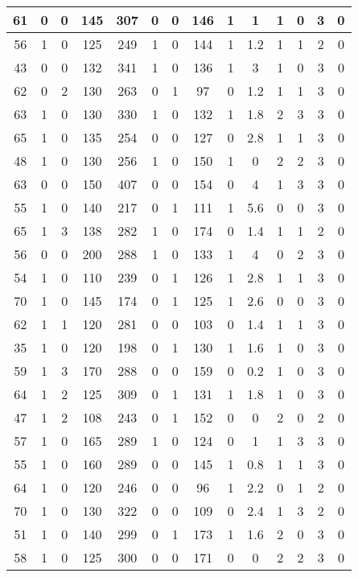 \documentclass{article}
\begin{document}
\begin{longtable}{|c|c|c|c|c|c|c|c|c|c|c|c|c|c|}
\hline
61 & 0 & 0 & 145 & 307 & 0 & 0 & 146 & 1 & 1 & 1 & 0 & 3 & 0\\
\hline
56 & 1 & 0 & 125 & 249 & 1 & 0 & 144 & 1 & 1.2 & 1 & 1 & 2 & 0\\
\hline
43 & 0 & 0 & 132 & 341 & 1 & 0 & 136 & 1 & 3 & 1 & 0 & 3 & 0\\
\hline
62 & 0 & 2 & 130 & 263 & 0 & 1 & 97 & 0 & 1.2 & 1 & 1 & 3 & 0\\
\hline
63 & 1 & 0 & 130 & 330 & 1 & 0 & 132 & 1 & 1.8 & 2 & 3 & 3 & 0\\
\hline
65 & 1 & 0 & 135 & 254 & 0 & 0 & 127 & 0 & 2.8 & 1 & 1 & 3 & 0\\
\hline
48 & 1 & 0 & 130 & 256 & 1 & 0 & 150 & 1 & 0 & 2 & 2 & 3 & 0\\
\hline
63 & 0 & 0 & 150 & 407 & 0 & 0 & 154 & 0 & 4 & 1 & 3 & 3 & 0\\
\hline
55 & 1 & 0 & 140 & 217 & 0 & 1 & 111 & 1 & 5.6 & 0 & 0 & 3 & 0\\
\hline
65 & 1 & 3 & 138 & 282 & 1 & 0 & 174 & 0 & 1.4 & 1 & 1 & 2 & 0\\
\hline
56 & 0 & 0 & 200 & 288 & 1 & 0 & 133 & 1 & 4 & 0 & 2 & 3 & 0\\
\hline
54 & 1 & 0 & 110 & 239 & 0 & 1 & 126 & 1 & 2.8 & 1 & 1 & 3 & 0\\
\hline
70 & 1 & 0 & 145 & 174 & 0 & 1 & 125 & 1 & 2.6 & 0 & 0 & 3 & 0\\
\hline
62 & 1 & 1 & 120 & 281 & 0 & 0 & 103 & 0 & 1.4 & 1 & 1 & 3 & 0\\
\hline
35 & 1 & 0 & 120 & 198 & 0 & 1 & 130 & 1 & 1.6 & 1 & 0 & 3 & 0\\
\hline
59 & 1 & 3 & 170 & 288 & 0 & 0 & 159 & 0 & 0.2 & 1 & 0 & 3 & 0\\
\hline
64 & 1 & 2 & 125 & 309 & 0 & 1 & 131 & 1 & 1.8 & 1 & 0 & 3 & 0\\
\hline
47 & 1 & 2 & 108 & 243 & 0 & 1 & 152 & 0 & 0 & 2 & 0 & 2 & 0\\
\hline
57 & 1 & 0 & 165 & 289 & 1 & 0 & 124 & 0 & 1 & 1 & 3 & 3 & 0\\
\hline
55 & 1 & 0 & 160 & 289 & 0 & 0 & 145 & 1 & 0.8 & 1 & 1 & 3 & 0\\
\hline
64 & 1 & 0 & 120 & 246 & 0 & 0 & 96 & 1 & 2.2 & 0 & 1 & 2 & 0\\
\hline
70 & 1 & 0 & 130 & 322 & 0 & 0 & 109 & 0 & 2.4 & 1 & 3 & 2 & 0\\
\hline
51 & 1 & 0 & 140 & 299 & 0 & 1 & 173 & 1 & 1.6 & 2 & 0 & 3 & 0\\
\hline
58 & 1 & 0 & 125 & 300 & 0 & 0 & 171 & 0 & 0 & 2 & 2 & 3 & 0\\

\end{longtable}
\end{document}
